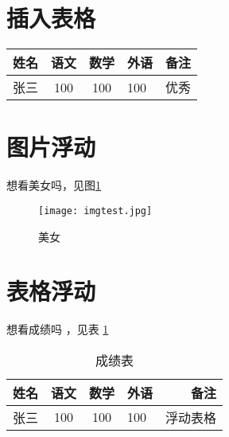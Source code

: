 \documentclass[]{ctexart}
\begin{document}
	\section{插入表格}
	\begin{tabular}{l || c  c | p{1.5cm} | r}
		\hline   %
		姓名 & 语文 & 数学 & 外语 & 备注 \\ %
		\hline \hline  %
		张三 & 100 & 100 & 100 & 优秀 \\	
		\hline   %
	\end{tabular}

	
	

	\section{图片浮动}
	想看美女吗，见图\ref{mm}
	\begin{figure}[htbp]
		\centering			%
		
		\texttt{[image: imgtest.jpg]}
		\caption{美女}		%
		\label{mm}			%
	\end{figure}
	
	\section{表格浮动}
	想看成绩吗 ，见表 \ref{firsttable}
	\begin{table}[htbp]		%
		\centering			%
		\caption{成绩表}		%
		\begin{tabular}{l || c  c | p{1.5cm} | r}
			\hline   %
			姓名 & 语文 & 数学 & 外语 & 备注 \\ %
			\hline \hline  %
			张三 & 100 & 100 & 100 & 浮动表格 \\	
			\hline   %
		\end{tabular}
		\label{firsttable}
	\end{table}
 	
\end{document}
